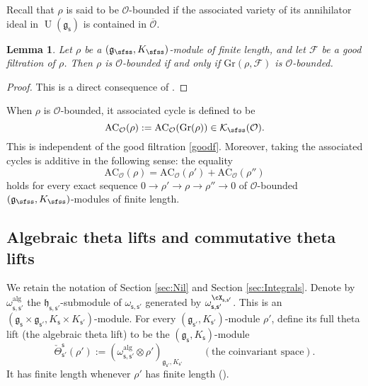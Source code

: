 \documentclass[12pt,a4paper]{amsart}
\newcommand{\CF}{{\mathcal {F}}}
\newcommand{\CK}{{\mathcal {K}}}
\newcommand{\CO}{{\mathcal {O}}}
\newcommand{\oU}{\operatorname{U}}
\newcommand{\g}{\mathfrak g}
\newcommand{\h}{\mathfrak h}
\numberwithin{equation}{section}
\newtheorem{lem}[thm]{Lemma}
\theoremstyle{remark}
\begin{document}
Recall that $\rho$ is said to be $\CO$-bounded if the associated variety of its annihilator ideal in $\oU(\g_\mathsf s)$ is contained in  $\overline \CO$.

\begin{lem}\label{l62}
Let $\rho$ be a $(\g_\sfss, K_{\sfss})$-module  of finite length,  and let $\CF$ be a  good filtration of $\rho$. Then $\rho$ is $\CO$-bounded if and only if $\mathrm{Gr}(\rho, \CF)$ is $\CO$-bounded.
\end{lem}
\begin{proof}
This is a direct consequence of   \cite[Theorem 8.4]{Vo89}.
\end{proof}

When $\rho$ is  $\CO$-bounded, it associated cycle is defined to be
\[
   \mathrm{AC}_\CO(\rho):= \mathrm{AC}_\CO(\mathrm{Gr}(\rho))\in  \CK_\sfss(\CO).
\]
This is independent of the good filtration \eqref{goodf}. Moreover, taking the associated cycles is additive in the following sense: the equality
\[
 \mathrm{AC}_\CO(\rho)= \mathrm{AC}_\CO(\rho')+ \mathrm{AC}_\CO(\rho'')
\]
holds for every exact sequence
$0\rightarrow \rho'\rightarrow \rho\rightarrow \rho''\rightarrow 0$ of  $\CO$-bounded  $(\g_\sfss, K_{\sfss})$-modules of finite length.



\subsection{Algebraic theta lifts and commutative theta lifts}


We retain the notation of Section \ref{sec:Nil} and Section \ref{sec:Integrals}.
Denote by $\omega^{\mathrm{alg}}_{\mathsf s, \mathsf s'}$ the $\h_{\mathsf s, \mathsf s'}$-submodule of $\omega_{\mathsf s, \mathsf s'}$ generated by  $ \omega_{\mathsf s, \mathsf s'}^{\cX_{\mathsf s, \mathsf s'}}$. This is an $(\g_\mathsf s\times \g_{\mathsf s'}, K_\mathsf s\times K_{\mathsf s'})$-module. For every $ (\g_{\mathsf s'}, K_{\mathsf s'})$-module $\rho'$, define its full theta lift (the algebraic theta lift) to be the $(\g_{\mathsf s}, K_{\mathsf s})$-module
\[
   \check \Theta_{\mathsf s'}^{\mathsf s}(\rho'):=(\omega^{\mathrm{alg}}_{\mathsf s, \mathsf s'}\otimes \rho')_{\g_{\mathsf s'}, K_{\mathsf s'}} \qquad (\textrm{the  coinvariant space}).
\]
It has finite length whenever $\rho'$ has finite length (\cite[Section 4]{Howe89}). 
\end{document}
